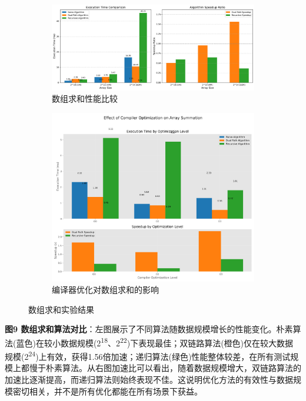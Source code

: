 \documentclass[a4paper,colorlinks=true,linkcolor=blue,urlcolor=blue,citecolor=green,bookmarks=true]{article}
\begin{document}
\begin{figure}[htbp]
  \centering
  \begin{subfigure}[b]{0.45\textwidth}
    \centering
    \includegraphics[width=\textwidth]{sum_array_performance.png}
    \caption{数组求和性能比较}
    \label{fig:sum_array_performance}
  \end{subfigure}
  \hfill
  \begin{subfigure}[b]{0.45\textwidth}
    \centering
    \includegraphics[width=\textwidth]{compiler_opt_sum.png}
    \caption{编译器优化对数组求和的影响}
    \label{fig:compiler_opt_sum}
  \end{subfigure}
  \caption{数组求和实验结果}
  \label{fig:array_results}
\end{figure}

\textbf{图9 数组求和算法对比}：左图展示了不同算法随数据规模增长的性能变化。朴素算法(蓝色)在较小数据规模(2\textsuperscript{18}、2\textsuperscript{22})下表现最佳；双链路算法(橙色)仅在较大数据规模(2\textsuperscript{24})上有效，获得1.56倍加速；递归算法(绿色)性能整体较差，在所有测试规模上都慢于朴素算法。从右图加速比可以看出，随着数据规模增大，双链路算法的加速比逐渐提高，而递归算法则始终表现不佳。这说明优化方法的有效性与数据规模密切相关，并不是所有优化都能在所有场景下获益。
\end{document}
